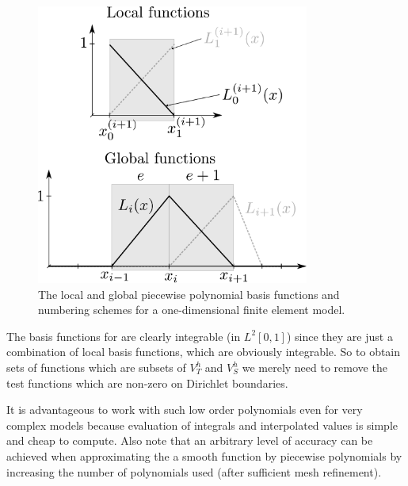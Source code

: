 \begin{figure}
  \center
  \includegraphics[width=0.8\textwidth]{./images/local_global_functions}
  \caption{The local and global piecewise polynomial basis functions and numbering schemes for a one-dimensional finite element model.   %
  }
  \label{fig:local_global_functions}
\end{figure}




The basis functions for are clearly integrable (\ie in $L^2[0,1]$) since they are just a combination of local basis functions, which are obviously integrable.
So to obtain sets of functions which are subsets of $V_T^h$ and $V_S^h$ we merely need to remove the test functions which are non-zero on Dirichlet boundaries.

It is advantageous to work with such low order polynomials even for very complex models because evaluation of integrals and interpolated values is simple and cheap to compute.
Also note that an arbitrary level of accuracy can be achieved when approximating the a smooth function by piecewise polynomials by increasing the number of polynomials used (\ie after sufficient mesh refinement).

